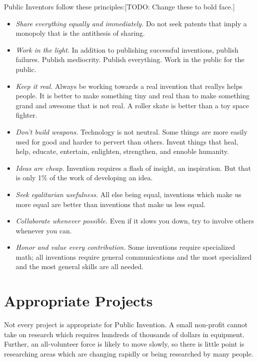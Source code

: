 \documentclass[
	fontsize=10pt, %
	twoside=false, %
	secnumdepth=1, %
]{kaobook}
\begin{document}
Public Inventors follow these principles:[TODO: Change these to bold face.]
\begin{itemize}
\item
  {\em Share everything equally and immediately.} Do not seek patents that imply a monopoly that is the antithesis of sharing.
\item
  {\em Work in the light.} In addition to publishing successful inventions, publish failures. Publish mediocrity. Publish everything. Work in the public for the public.
\item
  {\em Keep it real.} Always be working towards a real invention that reallys helps people. It is better to make something tiny and real than to make something grand and awesome that is not real. A roller skate is better than a toy space fighter.
\item
  {\em Don’t build weapons.} Technology is not neutral. Some things are more easily used for good and harder to pervert than others. Invent things that heal, help, educate, entertain, enlighten, strengthen, and ennoble humanity.
\item
  {\em Ideas are cheap.} Invention requires a flash of insight, an inspiration. But that is only 1\% of the work of developing an idea.
\item
  {\em Seek egalitarian usefulness.} All else being equal, inventions which make us more equal are better than inventions that make us less equal.
\item
  {\em Collaborate whenever possible.} Even if it slows you down, try to involve others whenever you can.
\item
  {\em Honor and value every contribution.} Some inventions require specialized math; all inventions require general communications and the most specialized and the most general skills are all needed.
\end{itemize}

\section{Appropriate Projects}

Not every project is appropriate for Public Invention.
A small non-profit cannot take on research which requires hundreds of thousands of dollars
in equipment. Further, an all-volunteer force is likely to move slowly, so there
is little point is researching areas which are changing rapidly or being
researched by many people.
\end{document}
